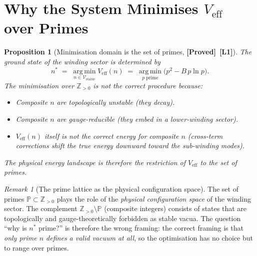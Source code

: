 \documentclass[12pt,a4paper]{article}
\newtheorem{proposition}[theorem]{Proposition}
\theoremstyle{definition}
\theoremstyle{remark}
\newtheorem{remark}[theorem]{Remark}
\newcommand{\ZZ}{\mathbb{Z}}
\newcommand{\PP}{\mathbb{P}}  %
\newcommand{\PROVED}{\textbf{[Proved]}}
\newcommand{\Lone}{\textbf{[L1]}}
\begin{document}
\section{Why the System Minimises $V_{\mathrm{eff}}$ over Primes}
\label{sec:psp:minimisation}

\begin{proposition}[Minimisation domain is the set of primes, \PROVED\ \Lone]
\label{prop:psp:domain}
The ground state of the winding sector is determined by
\begin{equation}
  n^*
  \;=\; \operatorname*{arg\,min}_{n \in \mathcal{V}_{\mathrm{stable}}}
           V_{\mathrm{eff}}(n)
  \;=\; \operatorname*{arg\,min}_{p \;\text{prime}}
           \bigl( p^2 - B\,p\ln p \bigr).
  \label{eq:psp:argmin}
\end{equation}
The minimisation over $\ZZ_{>0}$ is \emph{not} the correct procedure because:
\begin{itemize}
  \item Composite $n$ are topologically unstable (they decay).
  \item Composite $n$ are gauge-reducible (they embed in a lower-winding sector).
  \item $V_{\mathrm{eff}}(n)$ itself is not the correct energy for composite $n$
        (cross-term corrections shift the true energy downward toward the
        sub-winding modes).
\end{itemize}
The physical energy landscape is therefore the restriction of $V_{\mathrm{eff}}$
to the set of primes.
\end{proposition}

\begin{remark}[The prime lattice as the physical configuration space]
The set of primes $\PP \subset \ZZ_{>0}$ plays the role of the
\emph{physical configuration space} of the winding sector.  The complement
$\ZZ_{>0} \setminus \PP$ (composite integers) consists of states that are
topologically and gauge-theoretically forbidden as stable vacua.
The question ``why is $n^*$ prime?'' is therefore the wrong framing:
the correct framing is that \emph{only prime $n$ defines a valid vacuum
at all}, so the optimisation has no choice but to range over primes.
\end{remark}

\end{document}
